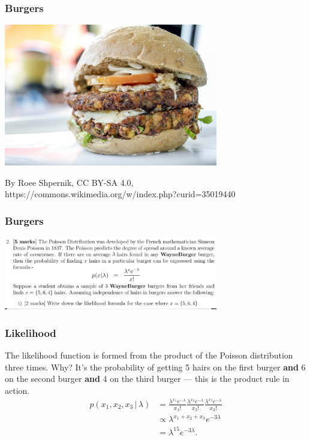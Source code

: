 \documentclass{beamer}
\newcommand{\given}{\,|\,}
\begin{document}
\begin{frame}
\frametitle{Burgers}

\centering
\includegraphics[width=0.7\textwidth]{images/burger.jpg}

By Roee Shpernik, CC BY-SA 4.0, https://commons.wikimedia.org/w/index.php?curid=35019440

\end{frame}


\begin{frame}
\frametitle{Burgers}

\centering
\includegraphics[width=0.7\textwidth]{images/wayneburger.png}

\end{frame}


\begin{frame}
\frametitle{Likelihood}
The likelihood function is formed from the product of the Poisson distribution
three times. Why? It's the probability of getting 5 hairs on the first burger
{\bf and} 6 on the second burger {\bf and} 4 on the third burger --- this is
the product rule in action.\pause
\begin{align}
p(x_1, x_2, x_3 \given \lambda)
    &= \frac{\lambda^{x_1}e^{-\lambda}}{x_1!}
        \frac{\lambda^{x_2}e^{-\lambda}}{x_2!}
        \frac{\lambda^{x_3}e^{-\lambda}}{x_3!} \\
    &\propto 
        \lambda^{x_1+x_2+x_3}e^{-3\lambda} \\
    &= \lambda^{15}e^{-3\lambda}.
\end{align}

\end{frame}
\end{document}
